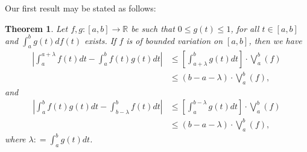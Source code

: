 \documentclass{amsart}
\newtheorem{theorem}{Theorem}
\theoremstyle{plain}
\numberwithin{equation}{section}
\begin{document}
Our first result may be stated as follows:
\begin{theorem}
\label{thm.BV}Let $f,g: [a,b] \to \mathbb{R}$ be such that $0 \le
g(t) \le 1$, for all $t \in [a,b]$ and $\int_a^b {g\left( t
\right)df\left( t \right)}$  exists. If $f$ is of bounded
variation on $[a,b]$, then we have
\begin{align}
\label{eq2.3}\left| {\int_a^{a + \lambda } {f\left( t \right)dt} -
\int_a^b {f\left( t \right)g\left( t \right)dt} } \right| &\le
\left[ {\int_{a + \lambda }^b {g\left( t \right)dt} } \right]
\cdot \bigvee_a^b \left( f \right)
\\
&\le \left( {b - a - \lambda } \right) \cdot \bigvee_a^b \left( f
\right),\nonumber
\end{align}
and
\begin{align}
\label{eq2.4}\left| {\int_a^b {f\left( t \right)g\left( t
\right)dt}  - \int_{b - \lambda }^b {f\left( t \right)dt} }
\right| &\le \left[ {\int_a^{b - \lambda } {g\left( t \right)dt} }
\right] \cdot \bigvee_a^b \left( f \right)
\\
&\le \left( {b - a - \lambda } \right) \cdot \bigvee_a^b \left( f
\right),\nonumber
\end{align}
where $\lambda : = \int_a^b {g\left( t \right)dt}$.
\end{theorem}
\end{document}
